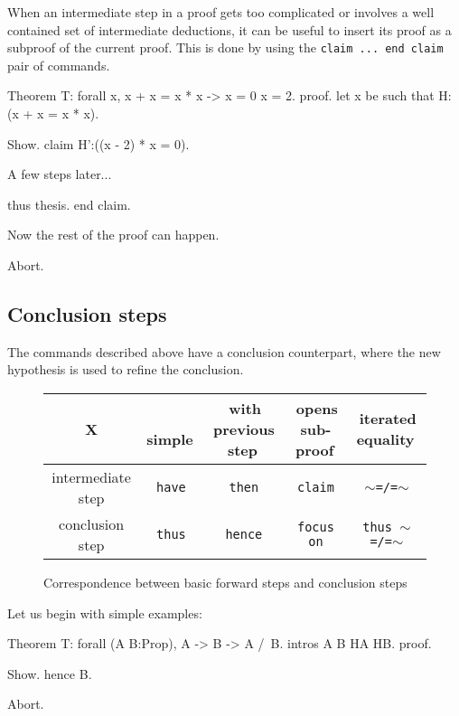 When an intermediate step in a proof gets too complicated or involves a
well contained set of intermediate deductions, it can be useful to insert
its proof as a subproof of the current proof. This is done by using the
{\tt claim ... end claim} pair of commands.

\begin{coq_eval}
Theorem T: forall x, x + x = x * x -> x = 0 \/ x = 2.
proof.
let x be such that H:(x + x = x * x).
\end{coq_eval} 
\begin{coq_example}
Show.
claim H':((x - 2) * x = 0).
\end{coq_example}

A few steps later...

\begin{coq_example}
thus thesis. 
end claim.
\end{coq_example}

Now the rest of the proof can happen.

\begin{coq_eval}
Abort.
\end{coq_eval}

\subsection{Conclusion steps}

The commands described above have a conclusion counterpart, where the
new hypothesis is used to refine the conclusion.

\begin{figure}[b]
 \centering
\begin{tabular}{c|c|c|c|c|}
        X       & \,simple\, & \,with previous step\, & 
               \,opens sub-proof\, & \,iterated equality\, \\
\hline
intermediate step & {\tt have} & {\tt then} & 
               {\tt claim} & {\tt $\sim$=/=$\sim$}\\ 
conclusion step & {\tt thus} & {\tt hence} & 
                {\tt focus on} & {\tt thus $\sim$=/=$\sim$}\\ 
\hline
\end{tabular}
\caption{Correspondence between basic forward steps and conclusion steps}
\end{figure}

Let us begin with simple examples:

\begin{coq_eval}
Theorem T: forall (A B:Prop), A -> B -> A /\ B.
intros A B HA HB.
proof.
\end{coq_eval} 
\begin{coq_example}
Show.
hence B.
\end{coq_example}
\begin{coq_eval}
Abort.
\end{coq_eval}

